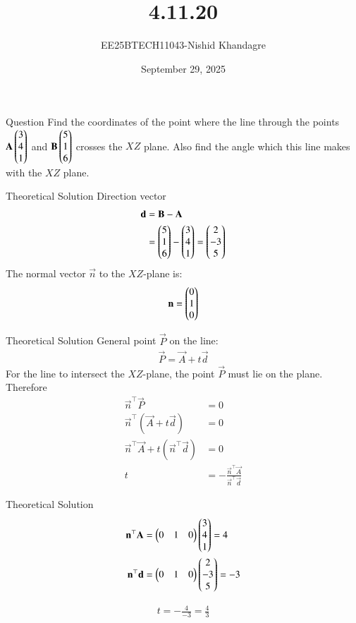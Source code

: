 \documentclass{beamer}
\title
{4.11.20}
\date{September 29, 2025}
\author
{EE25BTECH11043-Nishid Khandagre}
\begin{document}
\frame{\titlepage}
\begin{frame}{Question}
Find the coordinates of the point where the line through the points $\mathbf{A} \begin{pmatrix}3\\4\\1\end{pmatrix}$ and $\mathbf{B}\begin{pmatrix}5\\1\\6\end{pmatrix}$ crosses the $XZ$ plane. Also find the angle which this line makes with the $XZ$ plane.
\end{frame}
\begin{frame}{Theoretical Solution}
Direction vector
\begin{align}
\mathbf{d} &= \mathbf{B} - \mathbf{A}\\
&=\begin{pmatrix}5 \\ 1 \\ 6\end{pmatrix} - \begin{pmatrix}3 \\ 4 \\ 1\end{pmatrix} = \begin{pmatrix}2 \\ -3 \\ 5\end{pmatrix}
\end{align}
The normal vector $\vec{n}$ to the $XZ$-plane is:
\begin{align}
\mathbf{n} = \begin{pmatrix}0 \\ 1 \\ 0\end{pmatrix}
\end{align}
\end{frame}
\begin{frame}{Theoretical Solution}
General point $\vec{P}$ on the line:
\begin{align}
\vec{P} = \vec{A} + t\vec{d}
\end{align}
For the line to intersect the $XZ$-plane, the point $\vec{P}$ must lie on the plane.
Therefore
\begin{align}
\vec{n}^\top\vec{P}&=0\\
\vec{n}^\top(\vec{A} + t\vec{d}) &= 0 \\
\vec{n}^\top \vec{A} + t (\vec{n}^\top \vec{d}) &= 0 \\
t &= -\frac{\vec{n}^\top \vec{A}}{\vec{n}^\top \vec{d}}
\end{align}
\end{frame}
\begin{frame}{Theoretical Solution}
\begin{align}
\mathbf{n}^\top \mathbf{A} &= \begin{pmatrix}0 & 1 & 0\end{pmatrix} \begin{pmatrix}3 \\ 4 \\ 1\end{pmatrix} =4 \\
\mathbf{n}^\top \mathbf{d} &= \begin{pmatrix}0 & 1 & 0\end{pmatrix} \begin{pmatrix}2 \\ -3 \\ 5\end{pmatrix}= -3
\end{align}

\begin{align}
t = -\frac{4}{-3} = \frac{4}{3}
\end{align}
\end{frame}
\end{document}

